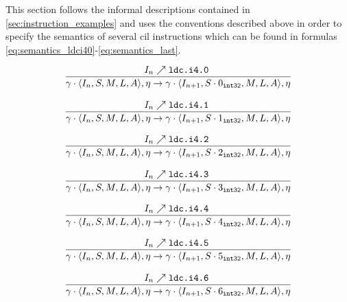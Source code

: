 \documentclass{article}
\numberwithin{equation}{section}
\newcommand{\mstate}[5] {
	\langle#1, #2, #3, #4, #5\rangle
}
\newcommand{\ipointsto}[3] {
	#1 \nearrow \texttt{#2} \text{ } #3
}
\newcommand{\sval}[2] {
	#1_\texttt{#2}
}
\begin{document}
This section follows the informal descriptions contained in \ref{sec:instruction_examples} and uses the conventions described above in order to specify the semantics of several \acrshort{cil} instructions which can be found in formulas \ref{eq:semantics_ldci40}-\ref{eq:semantics_last}.

\begin{equation}
\label{eq:semantics_ldci40}
	\infer{
		\gamma \cdot \mstate{I_n}{S}{M}{L}{A}, \eta
			\rightarrow
		\gamma \cdot \mstate{I_{n+1}}{S \cdot \sval{0}{int32}}{M}{L}{A}, \eta
	}
	{\ipointsto{I_n}{ldc.i4.0}}
\end{equation}

\begin{equation}
\label{eq:semantics_ldci41}
	\infer{
		\gamma \cdot \mstate{I_n}{S}{M}{L}{A}, \eta
			\rightarrow
		\gamma \cdot \mstate{I_{n+1}}{S \cdot \sval{1}{int32}}{M}{L}{A}, \eta
	}
	{\ipointsto{I_n}{ldc.i4.1}}
\end{equation}

\begin{equation}
\label{eq:semantics_ldci42}
	\infer{
		\gamma \cdot \mstate{I_n}{S}{M}{L}{A}, \eta
			\rightarrow
		\gamma \cdot \mstate{I_{n+1}}{S \cdot \sval{2}{int32}}{M}{L}{A}, \eta
	}
	{\ipointsto{I_n}{ldc.i4.2}}
\end{equation}

\begin{equation}
\label{eq:semantics_ldci43}
	\infer{
		\gamma \cdot \mstate{I_n}{S}{M}{L}{A}, \eta
			\rightarrow
		\gamma \cdot \mstate{I_{n+1}}{S \cdot \sval{3}{int32}}{M}{L}{A}, \eta
	}
	{\ipointsto{I_n}{ldc.i4.3}}
\end{equation}

\begin{equation}
\label{eq:semantics_ldci44}
	\infer{
		\gamma \cdot \mstate{I_n}{S}{M}{L}{A}, \eta
			\rightarrow
		\gamma \cdot \mstate{I_{n+1}}{S \cdot \sval{4}{int32}}{M}{L}{A}, \eta
	}
	{\ipointsto{I_n}{ldc.i4.4}}
\end{equation}

\begin{equation}
\label{eq:semantics_ldci45}
	\infer{
		\gamma \cdot \mstate{I_n}{S}{M}{L}{A}, \eta
			\rightarrow
		\gamma \cdot \mstate{I_{n+1}}{S \cdot \sval{5}{int32}}{M}{L}{A}, \eta
	}
	{\ipointsto{I_n}{ldc.i4.5}}
\end{equation}

\begin{equation}
\label{eq:semantics_ldci46}
	\infer{
		\gamma \cdot \mstate{I_n}{S}{M}{L}{A}, \eta
			\rightarrow
		\gamma \cdot \mstate{I_{n+1}}{S \cdot \sval{6}{int32}}{M}{L}{A}, \eta
	}
	{\ipointsto{I_n}{ldc.i4.6}}
\end{equation}
\end{document}
